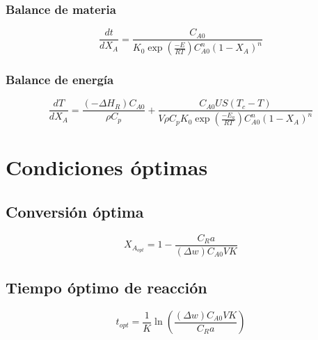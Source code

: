 \documentclass[20pt,a4paper]{extarticle}
\begin{document}
		\subsubsection{Balance de materia}
			\begin{equation*}
				\frac{dt}{dX_A} = \frac{C_{A0}}{K_0 \exp\left(\frac{-E}{RT}\right) C_{A0}^n (1-X_A)^n}
			\end{equation*}
			
		\subsubsection{Balance de energía}
			\begin{equation*}
				\frac{dT}{dX_A} = \frac{(-\Delta H_R)C_{A0}}{\rho C_p} + \frac{C_{A0}US(T_c-T)}{V\rho C_p K_0 \exp\left(\frac{-E_a}{RT}\right)C_{A0}^n(1-X_A)^n}
			\end{equation*}
			
\section{Condiciones óptimas}
	\subsection{Conversión óptima}
		\begin{equation*}
			X_{A_{opt}} = 1- \frac{C_R a}{(\Delta w) C_{A0}VK}
		\end{equation*}		
		
	\subsection{Tiempo óptimo de reacción}
		\begin{equation*}
			t_{opt} = \frac{1}{K}\ln \left(\frac{(\Delta w)C_{A0}VK}{C_R a}\right)
		\end{equation*}
		
\end{document}
